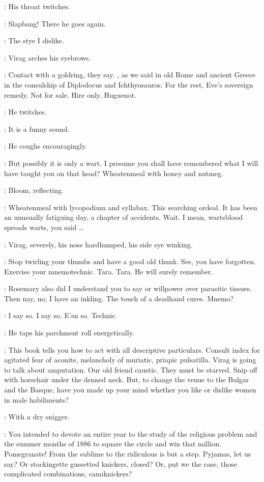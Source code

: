:
His throat twitches.

\Virag:
Slapbang!
There he goes again.

\Bloom:
The stye I dislike.

:
Virag arches his eyebrows.

\Virag:
Contact with a goldring, they say.
,
as we said in old Rome and ancient Greece
in the consulship of Diplodocus and Ichthyosauros.
For the rest, Eve's sovereign remedy.
Not for sale.
Hire only.
Huguenot.

:
He twitches.

\Virag:
It is a funny sound.

:
He coughs encouragingly.

\Virag:
But possibly it is only a wart.
I presume you shall have remembered what I will have taught you on that head?
Wheatenmeal with honey and nutmeg.

:
Bloom, reflecting.

\Bloom:
Wheatenmeal with lycopodium and syllabax.
This searching ordeal.
It has been an unusually fatiguing day, a chapter of accidents.
Wait.
I mean, wartsblood spreads warts, you said \ldots

:
Virag, severely, his nose hardhumped, his side eye winking.

\Virag:
Stop twirling your thumbs and have a good old thunk.
See, you have forgotten.
Exercise your mnemotechnic.
Tara. Tara.
He will surely remember.

\Bloom:
Rosemary also did I understand you to say or willpower over parasitic tissues.
Then nay, no, I have an inkling.
The touch of a deadhand cures.
Mnemo?%

\Virag:
I say so. I say so.
E'en so.
Technic.

:
He taps his parchment roll energetically.

\Virag:
This book tells you how to act with all descriptive particulars.
Consult index for agitated fear of aconite,
melancholy of muriatic, priapic pulsatilla.
Virag is going to talk about amputation.
Our old friend caustic.
They must be starved.
Snip off with horsehair under the denned neck.
But, to change the venue to the Bulgar and the Basque,
have you made up your mind
whether you like or dislike women in male habiliments?

:
With a dry snigger.

\Virag:
You intended to devote an entire year to the study
of the religious problem and the summer months of 1886
to square the circle and win that million.
Pomegranate!
From the sublime to the ridiculous is but a step.
Pyjamas, let us say?
Or stockingette gussetted knickers, closed?
Or, put we the case, those complicated combinations, camiknickers?

